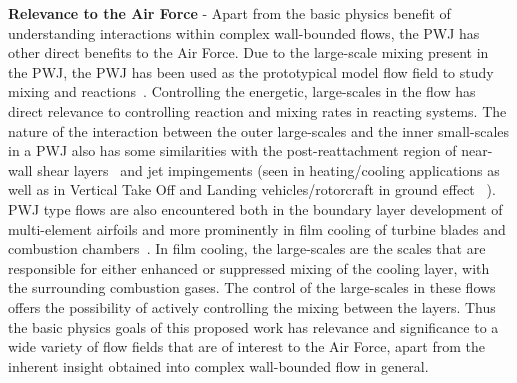 \noindent \textbf{Relevance to the Air Force} - Apart from the basic physics benefit of understanding interactions within complex wall-bounded flows, the PWJ has other direct benefits to the Air Force. Due to the large-scale mixing present in the PWJ, the PWJ has been used as the prototypical model flow field to study mixing and reactions~\citep{Ahlman2007a,Pouransari2011a,Pouransari2013a}. Controlling the energetic, large-scales in the flow has direct relevance to controlling reaction and mixing rates in reacting systems. The nature of the interaction between the outer large-scales and the inner small-scales in a PWJ also has some similarities with the post-reattachment region of near-wall shear layers~\citep{Dejoan2005a} and jet impingements (seen in heating/cooling applications as well as in Vertical Take Off and Landing vehicles/rotorcraft in ground effect ~\citep{Agarwal1982a,Looney1984a,Jambunathan1992a,Rauleder2014a,Rauleder2014b}). PWJ type flows are also encountered both in the boundary layer development of multi-element airfoils and more prominently in film cooling of turbine blades and combustion chambers~\citep{Launder1983a,Wygnanski1992a}. In film cooling, the large-scales are the scales that are responsible for either enhanced or suppressed mixing of the cooling layer, with the surrounding combustion gases. The control of the large-scales in these flows offers the possibility of actively controlling the mixing between the layers. Thus the basic physics goals of this proposed work has relevance and significance to a wide variety of flow fields that are of interest to the Air Force, apart from the inherent insight obtained into complex wall-bounded flow in general.
